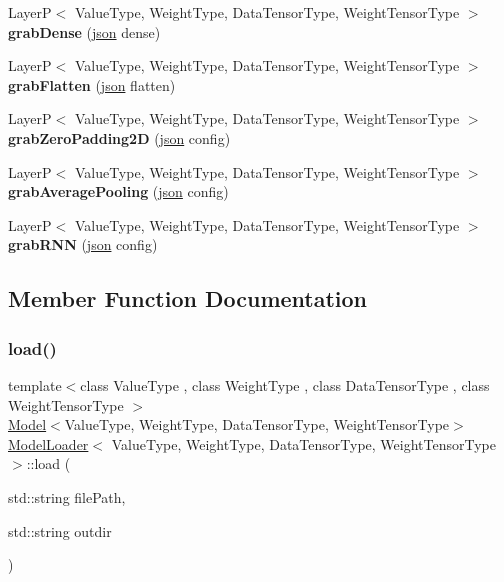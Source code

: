\begin{DoxyCompactItemize}
LayerP$<$ Value\+Type, Weight\+Type, Data\+Tensor\+Type, Weight\+Tensor\+Type $>$ {\bfseries grab\+Dense} (\hyperlink{classnlohmann_1_1basic__json}{json} dense)
\item 
\mbox{\label{classModelLoader_a5a6f348ff17e0b11da8c386b13564b3b}} 
LayerP$<$ Value\+Type, Weight\+Type, Data\+Tensor\+Type, Weight\+Tensor\+Type $>$ {\bfseries grab\+Flatten} (\hyperlink{classnlohmann_1_1basic__json}{json} flatten)
\item 
\mbox{\label{classModelLoader_a4d1dbc276c44d4d2658b585ea6d62fa6}} 
LayerP$<$ Value\+Type, Weight\+Type, Data\+Tensor\+Type, Weight\+Tensor\+Type $>$ {\bfseries grab\+Zero\+Padding2D} (\hyperlink{classnlohmann_1_1basic__json}{json} config)
\item 
\mbox{\label{classModelLoader_a855cd4ec6f859c2b675800ec73bd16ef}} 
LayerP$<$ Value\+Type, Weight\+Type, Data\+Tensor\+Type, Weight\+Tensor\+Type $>$ {\bfseries grab\+Average\+Pooling} (\hyperlink{classnlohmann_1_1basic__json}{json} config)
\item 
\mbox{\label{classModelLoader_af3cf14feeb755067469f80abd612d29f}} 
LayerP$<$ Value\+Type, Weight\+Type, Data\+Tensor\+Type, Weight\+Tensor\+Type $>$ {\bfseries grab\+R\+NN} (\hyperlink{classnlohmann_1_1basic__json}{json} config)
\end{DoxyCompactItemize}


\subsection{Member Function Documentation}
\mbox{\label{classModelLoader_a0cf2360378b206d4ca67c082510eab44}} 
\subsubsection{\texorpdfstring{load()}{load()}}
{\footnotesize\ttfamily template$<$class Value\+Type , class Weight\+Type , class Data\+Tensor\+Type , class Weight\+Tensor\+Type $>$ \\
\hyperlink{classModel}{Model}$<$Value\+Type, Weight\+Type, Data\+Tensor\+Type, Weight\+Tensor\+Type$>$ \hyperlink{classModelLoader}{Model\+Loader}$<$ Value\+Type, Weight\+Type, Data\+Tensor\+Type, Weight\+Tensor\+Type $>$\+::load (\begin{DoxyParamCaption}\item[{std\+::string}]{file\+Path,  }\item[{std\+::string}]{outdir }\end{DoxyParamCaption})\hspace{0.3cm}{\ttfamily [inline]}}



